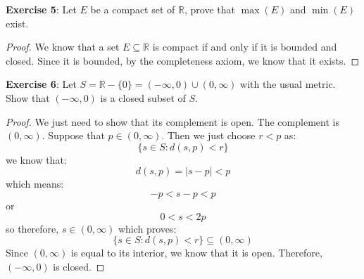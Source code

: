 \documentclass{article}
\begin{document}
\textbf{Exercise 5}: Let $E$ be a compact set of $\mathbb{R}$, prove that $\max(E)$ and $\min(E)$ exist.
    \begin{proof}
        We know that a set $E \subseteq \mathbb{R}$ is compact if and only if it is bounded and closed. Since it is bounded, by the completeness axiom, we know that it exists.
    \end{proof}

\textbf{Exercise 6}: Let $S = \mathbb{R} - \{0\} = (-\infty, 0) \cup (0, \infty)$ with the usual metric. Show that $(-\infty, 0)$ is a closed subset of $S$.
    \begin{proof}
        We just need to show that its complement is open. The complement is $(0, \infty)$. Suppose that $p \in (0, \infty)$. Then we just choose $r < p$ as:
            \begin{equation*}
                \{s \in S : d(s, p) < r\}
            \end{equation*}
        we know that:
            \begin{equation*}
                d(s, p) = \lvert s - p \rvert < p
            \end{equation*}
        which means:
            \begin{equation*}
                -p < s - p < p
            \end{equation*}
        or 
            \begin{equation*}
                0 < s < 2p
            \end{equation*}
        so therefore, $s \in (0, \infty)$ which proves:
            \begin{equation*}
                \{s \in S : d(s, p) < r\} \subseteq (0, \infty)
            \end{equation*}
        Since $(0, \infty)$ is equal to its interior, we know that it is open. Therefore, $(-\infty, 0)$ is closed.
    \end{proof}
\end{document}

